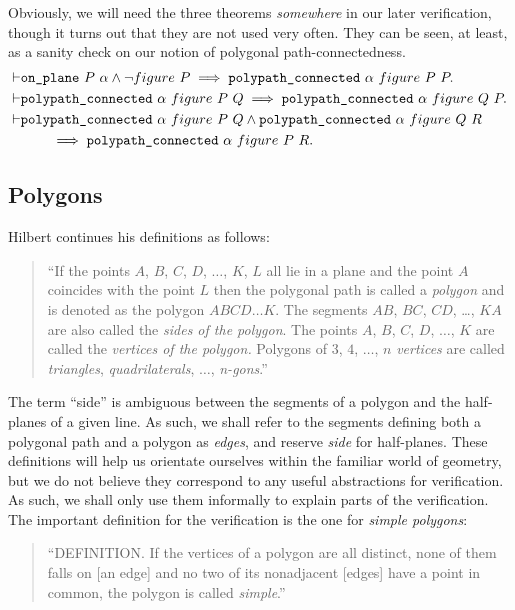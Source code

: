 Obviously, we will need the three theorems \emph{somewhere} in our later verification, though it turns out that they are not used very often. They can be seen, at least, as a sanity check on our notion of polygonal path-connectedness.
\begin{align*}
  \vdash&\texttt{on\_plane}\ P\ \alpha \wedge \neg figure\ P \implies \texttt{polypath\_connected}\ \alpha\ figure\ P\ P.\\
  \vdash&\texttt{polypath\_connected}\ \alpha\ figure\ P\ Q \implies \texttt{polypath\_connected}\ \alpha\ figure\ Q\ P.\\
  \vdash&\texttt{polypath\_connected}\ \alpha\ figure\ P\ Q \wedge \texttt{polypath\_connected}\ \alpha\ figure\ Q\ R\\
  &\qquad\implies \texttt{polypath\_connected}\ \alpha\ figure\ P\ R.
\end{align*}

\subsection{Polygons}\label{sec:polygonFormalisation}
Hilbert continues his definitions as follows:
\begin{quote}
``If the points $A$, $B$, $C$, $D$, $\ldots$, $K$, $L$ all lie in a plane and the point $A$ coincides with the point $L$ then the polygonal path is called a \emph{polygon} and is denoted as the polygon $ABCD\ldots K$. The segments $AB$, $BC$, $CD$, \ldots, $KA$ are also called the \emph{sides of the polygon}. The points $A$, $B$, $C$, $D$, $\ldots$, $K$ are called the \emph{vertices of the polygon.} Polygons of $3$, $4$, $\ldots$, $n$ \emph{vertices} are called \emph{triangles}, \emph{quadrilaterals}, $\ldots$, \emph{n-gons}.''
\end{quote}

The term ``side'' is ambiguous between the segments of a polygon and the half-planes of a given line. As such, we shall refer to the segments defining both a polygonal path and a polygon as \emph{edges}, and reserve \emph{side} for half-planes. These definitions will help us orientate ourselves within the familiar world of geometry, but we do not believe they correspond to any useful abstractions for verification. As such, we shall only use them informally to explain parts of the verification. The important definition for the verification is the one for \emph{simple polygons}:
\begin{quote}
  ``DEFINITION. If the vertices of a polygon are all distinct, none of them falls on [an edge] and no two of its nonadjacent [edges] have a point in common, the polygon is called \emph{simple}.''
\end{quote}

